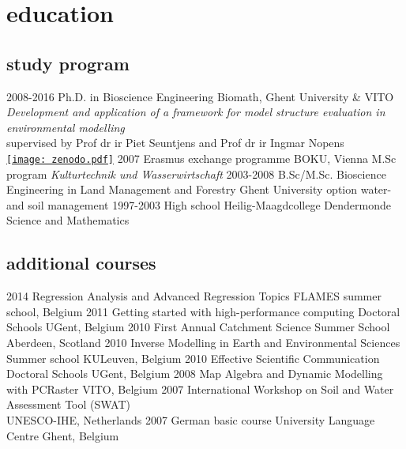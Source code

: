 \documentclass[]{stvhoey-cv}  %
\begin{document}
\section{education}
\subsection*{study program}
\begin{entrylist}
  \entry
    {2008-2016}
    {Ph.D. {\normalfont in Bioscience Engineering}}
    {Biomath, Ghent University \& VITO}
    {\emph{Development and application of a framework for model structure evaluation in environmental modelling}\\ %
		\small{supervised by Prof dr ir Piet Seuntjens and Prof dr ir Ingmar Nopens}\\
		        \href{https://doi.org/10.5281/zenodo.168478}{\texttt{[image: zenodo.pdf]}}}
  \entry
    {2007}
    {Erasmus exchange programme}
    {BOKU, Vienna}
    {M.Sc program \textit{Kulturtechnik und Wasserwirtschaft}}
  \entry
    {2003-2008}
    {B.Sc/M.Sc. Bioscience Engineering in Land Management and Forestry}
    {Ghent University}
    {option water- and soil management}
  \entry
    {1997-2003}
    {High school}
    {Heilig-Maagdcollege Dendermonde}
    {Science and Mathematics}
\end{entrylist}

\subsection*{additional courses}
\begin{entrylist}
  \shortentry
    {2014}
    {Regression Analysis and Advanced Regression Topics}
    {FLAMES summer school, Belgium}
  \shortentry
    {2011}
    {Getting started with high-performance computing}
    {Doctoral Schools UGent, Belgium}
  \shortentry
    {2010}
    {First Annual Catchment Science Summer School}
    {Aberdeen, Scotland}
  \shortentry
    {2010}
    {Inverse Modelling in Earth and Environmental Sciences}
    {Summer school KULeuven, Belgium}
  \shortentry
    {2010}
    {Effective Scientific Communication}
    {Doctoral Schools UGent, Belgium}
  \shortentry
    {2008}
    {Map Algebra and Dynamic Modelling with PCRaster}
    {VITO, Belgium}
  \shortentry
    {2007}
    {International Workshop on Soil and Water Assessment Tool (SWAT)\\ }
    {UNESCO-IHE, Netherlands}
  \shortentry
    {2007}
    {German basic course}
    {University Language Centre Ghent, Belgium}
\end{entrylist}
\end{document}
